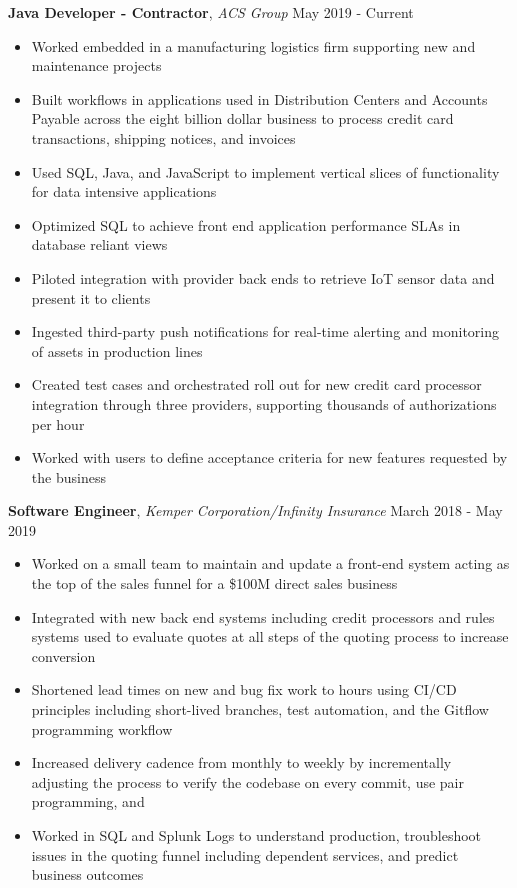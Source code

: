 \documentclass[9pt]{article}
\newenvironment{changemargin}[2]{%
  \begin{list}{}{%
      \setlength{\topsep}{0pt}%
      \setlength{\leftmargin}{#1}%
      \setlength{\rightmargin}{#2}%
      \setlength{\listparindent}{\parindent}%
      \setlength{\itemindent}{\parindent}%
      \setlength{\parsep}{\parskip}%
    }%
  \item[]}{\end{list}
}
\newenvironment{body} {
  \vspace*{-16pt}
  \begin{changemargin}{-0.25in}{-0.5in}
  }	
  {\end{changemargin}
}
\begin{document}
\begin{body}
  \vspace{17pt}
  

  \textbf{Java Developer - Contractor}, \emph{ACS Group} \hfill May 2019 - Current \\
  \vspace*{-4pt}
  \begin{itemize} \itemsep -0pt
  \item Worked embedded in a manufacturing logistics firm supporting new and maintenance projects
  \item Built workflows in applications used in Distribution Centers and Accounts Payable across the eight billion dollar business to process credit card transactions, shipping notices, and invoices
  \item Used SQL, Java, and JavaScript to implement vertical slices of functionality for data intensive applications
  \item Optimized SQL to achieve front end application performance SLAs in database reliant views
  \item Piloted integration with provider back ends to retrieve IoT sensor data and present it to clients
  \item Ingested third-party push notifications for real-time alerting and monitoring of assets in production lines
  \item Created test cases and orchestrated roll out for new credit card processor integration through three providers, supporting thousands of authorizations per hour
  \item Worked with users to define acceptance criteria for new features requested by the business
  \end{itemize}
  \vspace{17pt}
  

  \textbf{Software Engineer}, \emph{Kemper Corporation/Infinity Insurance} \hfill March 2018 - May 2019 \\
  \vspace*{-4pt}
  \begin{itemize} \itemsep -0pt
  \item Worked on a small team to maintain and update a front-end system acting as the top of the sales funnel for a \$100M direct sales business
  \item Integrated with new back end systems including credit processors and rules systems used to evaluate quotes at all steps of the quoting process to increase conversion
  \item Shortened lead times on new and bug fix work to hours using CI/CD principles including short-lived branches, test automation, and the Gitflow programming workflow
  \item Increased delivery cadence from monthly to weekly by incrementally adjusting the process to verify the codebase on every commit, use pair programming, and 
  \item Worked in SQL and Splunk Logs to understand production, troubleshoot issues in the quoting funnel including dependent services, and predict business outcomes
  \end{itemize}
  \vspace{17pt}
  


\end{body}
\end{document}
